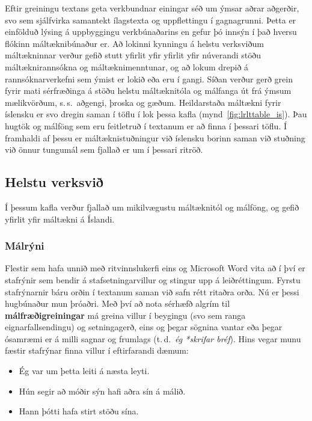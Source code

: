 \begin{multicols}{2}
Eftir greiningu textans geta verkbundnar einingar séð um ýmsar aðrar aðgerðir, svo sem sjálfvirka samantekt ílagstexta og uppflettingu í gagnagrunni. Þetta er einfölduð lýsing á uppbyggingu verkbúnaðarins en gefur þó innsýn í það hversu flókinn máltæknibúnaður er. Að lokinni kynningu á helstu verksviðum máltækninnar verður gefið stutt yfirlit yfir yfirlit yfir núverandi stöðu máltæknirannsókna og máltæknimenntunar, og að lokum drepið á rannsóknarverkefni sem ýmist er lokið eða eru í gangi. Síðan verður gerð grein fyrir mati sérfræðinga á stöðu helstu máltæknitóla og málfanga út frá ýmsum mælikvörðum, s.\,s.~aðgengi, þroska og gæðum. Heildarstaða máltækni fyrir íslensku er svo dregin saman í töflu í lok þessa kafla (mynd~\ref{fig:lrlttable_is}). Þau hugtök og málföng sem eru feitletruð í textanum er að finna í þessari töflu. Í framhaldi af þessu er máltæknistuðningur við íslensku borinn saman við stuðning við önnur tungumál sem fjallað er um í þessari ritröð.

\subsection{Helstu verksvið} 

Í þessum kafla verður fjallað um mikilvægustu máltæknitól og málföng, og gefið yfirlit yfir máltækni á Íslandi.

\subsubsection{Málrýni}

Flestir sem hafa unnið með ritvinnslukerfi eins og Microsoft Word vita að í því er stafrýnir sem bendir á stafsetningarvillur og stingur upp á leiðréttingum. Fyrstu stafrýnarnir báru orðin í textanum saman við safn rétt ritaðra orða. Nú er þessi hugbúnaður mun þróaðri. Með því að nota sérhæfð algrím til \textbf{málfræðigreiningar} má greina villur í beygingu (svo sem ranga eignarfallsendingu) og setningagerð, eins og þegar sögnina vantar eða þegar ósamræmi er á milli sagnar og frumlags (t.\,d.~\textit{ég *skrifar bréf}). Hins vegar munu fæstir stafrýnar finna villur í eftirfarandi dæmum:

\begin{itemize}
\item Ég var um þetta leiti á næsta leyti.
\item Hún segir að móðir sýn hafi aðra sín á málið.
\item Hann þótti hafa stirt stöðu sína.
\end{itemize}


\end{multicols}
